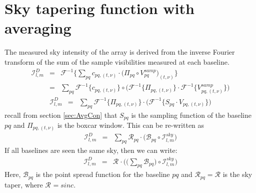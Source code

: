 \documentclass[useAMS,usenatbib]{mn2e}
\begin{document}
\section[]{Sky tapering function with averaging}
\label{label:similarimaging}
The measured sky intensity of the array is derived from the inverse Fourier transform of the sum of the sample visibilities 
measured at each baseline.
\begin{eqnarray*}
 \mathcal{I}^{D}_{l,m}&=& \mathcal{F}^{-1}\Bigg\{\sum_{pq} c_{pq,(t,\nu)}\cdot\Big(\Pi_{pq}\circ V_{pq}^{samp}\Big)_{(t,\nu)}\Bigg\}\\
		      &=&\sum_{pq} \mathcal{F}^{-1}\{c_{pq,(t,\nu)}\}\circ \Big(\mathcal{F}^{-1}\{\Pi_{pq,(t,\nu)}\}\cdot 
\mathcal{F}^{-1}\{V_{pq,(t,\nu)}^{samp}\}\Big)
\end{eqnarray*}
\begin{eqnarray*}	     
\mathcal{I}^{D}_{l,m}&=&\sum_{pq}\mathcal{F}^{-1}\{\Pi_{pq,(t,\nu)}\}\cdot\bigg(\mathcal{F}^{-1}\{S_{pq}\cdot V_{pq,(t,\nu)}\}
\bigg)
\end{eqnarray*}
recall from section \ref{sec:AvgCon} that $S_{pq}$ is the sampling function of the baseline $pq$ and $\Pi_{pq,(t,\nu)}$ is the 
boxcar window.  This can be re-written as
\begin{eqnarray*}	     
\mathcal{I}^{D}_{l,m}&=&\sum_{pq} \mathcal{R}_{pq} \cdot\bigg(\mathcal{B}_{pq}\circ \mathcal{I}^{sky}_{l,m}\bigg)
\end{eqnarray*}
If all baselines are seen the same sky, then we can write:
\begin{eqnarray*}	     
\mathcal{I}^{D}_{l,m}&=&\mathcal{R}_{}\cdot\Bigg(\bigg(\sum_{pq}\mathcal{B}_{pq}\bigg)\circ \mathcal{I}^{sky}_{l,m}\Bigg)
\end{eqnarray*}
Here, $\mathcal{B}_{pq}$ is the point spread function for the baseline $pq$ and $\mathcal{R}_{pq}= \mathcal{R}$ is the sky taper, where 
$\mathcal{R}_{}=sinc$.\\
\\
\bsp
\label{lastpage}
\end{document}
